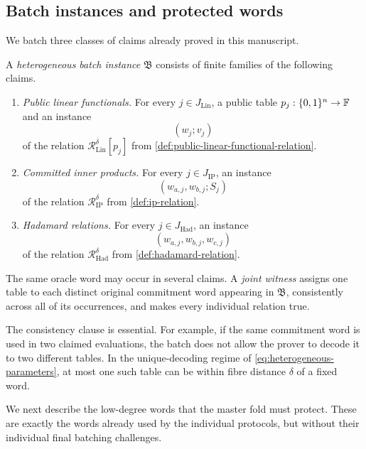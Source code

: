 \subsection{Batch instances and protected words}
\label{sec:batch-protected-words}

We batch three classes of claims already proved in this manuscript.

\begin{definition}
\label{def:heterogeneous-batch-instance}
A \emph{heterogeneous batch instance} $\mathfrak B$ consists of finite families of the following claims.
\begin{enumerate}[label=(\roman*),leftmargin=*]
  \item \emph{Public linear functionals.}  For every $j\in J_{\mathrm{Lin}}$, a public table $p_j:\{0,1\}^n\to\mathbb{F}$ and an instance
  \[
    (w_j;v_j)
  \]
  of the relation $\mathcal R^{\delta}_{\mathrm{Lin}}[p_j]$ from \cref{def:public-linear-functional-relation}.

  \item \emph{Committed inner products.}  For every $j\in J_{\mathrm{IP}}$, an instance
  \[
    (w_{a,j},w_{b,j};S_j)
  \]
  of the relation $\mathcal R^{\delta}_{\mathrm{IP}}$ from \cref{def:ip-relation}.

  \item \emph{Hadamard relations.}  For every $j\in J_{\mathrm{Had}}$, an instance
  \[
    (w_{a,j},w_{b,j},w_{c,j})
  \]
  of the relation $\mathcal R^{\delta}_{\mathrm{Had}}$ from \cref{def:hadamard-relation}.
\end{enumerate}
The same oracle word may occur in several claims.  A \emph{joint witness} assigns one table to each distinct original commitment word appearing in $\mathfrak B$, consistently across all of its occurrences, and makes every individual relation true.
\end{definition}

The consistency clause is essential.  For example, if the same commitment word is used in two claimed evaluations, the batch does not allow the prover to decode it to two different tables.  In the unique-decoding regime of \eqref{eq:heterogeneous-parameters}, at most one such table can be within fibre distance $\delta$ of a fixed word.

We next describe the low-degree words that the master fold must protect.  These are exactly the words already used by the individual protocols, but without their individual final batching challenges.

